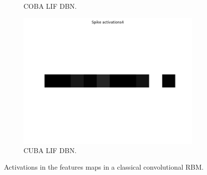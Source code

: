 \begin{figure}
\begin{subfigure}[t]{.24\textwidth}
  		\caption{COBA LIF DBN.}
  		\label{fig:sub2}
	\end{subfigure}
	\begin{subfigure}[t]{.24\textwidth}
  		\centering
  		\includegraphics[width=.9\linewidth]{imgs/convert/cuba00004.png}
  		\caption{CUBA LIF DBN.}
  		\label{fig:sub2}
	\end{subfigure}	
	\caption{Activations in the features maps in a classical convolutional RBM. }
	\label{fig:stripes}
\end{figure}
%
